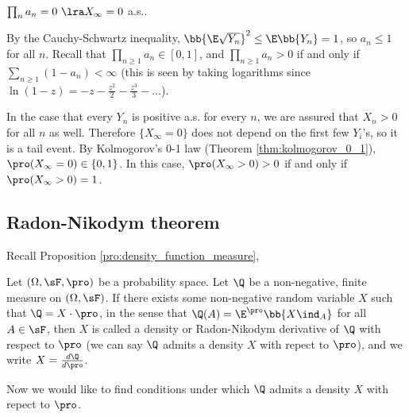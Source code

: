 \begin{remark}
$\prod_n a_n = 0 \ \lra X_\infty = 0$ a.s..

By the Cauchy-Schwartz inequality, $\bb{\E\sqrt{Y_n}}^2 \leq \E\bb{Y_n} = 1$, so $a_n \leq 1$ for all $n$. Recall that $\prod_{n\geq 1} a_n \in [0, 1]$, and $\prod_{n\geq 1} a_n > 0$ if and only if $\sum_{n\geq 1}(1 - a_n)
< \infty$ (this is seen by taking logarithms since $\ln (1-z) = -z - \frac {z^2}2 - \frac{z^3}3 - \dots$).
\end{remark}


\begin{remark}
In the case that every $Y_n$ is positive a.s. for every $n$, we are assured that $X_n > 0$ for all $n$ as well. Therefore $\{X_\infty = 0\}$ does not depend on the first few $Y_i$'s, so it is a tail event. By Kolmogorov's 0-1 law (Theorem \ref{thm:kolmogorov_0_1}), $\pro(X_\infty = 0) \in \{0, 1\}$. In this case, $\pro(X_\infty > 0) > 0$ if and only if $\pro(X_\infty > 0) = 1$.
\end{remark}




\subsection{Radon-Nikodym theorem}

Recall Proposition \ref{pro:density_function_measure},

\begin{definition}\label{def:radon_nikodym_derivative}
Let $(\Omega,\sF, \pro)$ be a probability space. Let $\Q$ be a non-negative, finite measure on $(\Omega,\sF)$. If there exists some non-negative random variable $X$ such that $\Q = X \cdot \pro$, in the sense that $\Q(A) = \E^\pro\bb{X\ind_A}$ for all $A \in \sF$, then $X$ is called a density or Radon-Nikodym derivative of $\Q$ with respect to $\pro$ (we can say $\Q$ admits a density $X$ with repect to $\pro$), and we write $X = \frac{d\Q}{d\pro}$.
\end{definition}

Now we would like to find conditions under which $\Q$ admits a density $X$ with repect to $\pro$.



